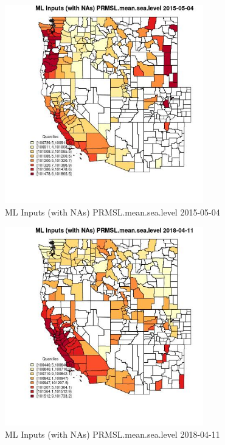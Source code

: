 \begin{figure} 
\centering  
\includegraphics[width=0.77\textwidth]{Code_Outputs/Report_ML_input_PM25_Step4_part_e_de_duplicated_aves_compiled_2019-05-18wNAs_CountyPRMSLmeansealevelMean2015-05-04_2015-05-04.jpg} 
\caption{\label{fig:Report_ML_input_PM25_Step4_part_e_de_duplicated_aves_compiled_2019-05-18wNAsCountyPRMSLmeansealevelMean2015-05-04_2015-05-04}ML Inputs (with NAs) PRMSL.mean.sea.level 2015-05-04} 
\end{figure} 
 

\begin{figure} 
\centering  
\includegraphics[width=0.77\textwidth]{Code_Outputs/Report_ML_input_PM25_Step4_part_e_de_duplicated_aves_compiled_2019-05-18wNAs_CountyPRMSLmeansealevelMean2018-04-11_2018-04-11.jpg} 
\caption{\label{fig:Report_ML_input_PM25_Step4_part_e_de_duplicated_aves_compiled_2019-05-18wNAsCountyPRMSLmeansealevelMean2018-04-11_2018-04-11}ML Inputs (with NAs) PRMSL.mean.sea.level 2018-04-11} 
\end{figure} 
 

